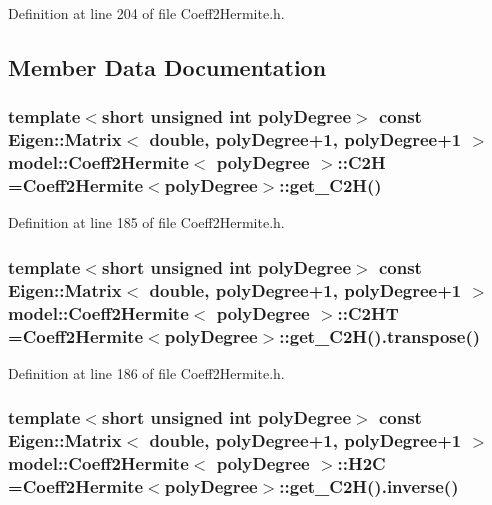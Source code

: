 Definition at line 204 of file Coeff2\+Hermite.\+h.



\subsection{Member Data Documentation}
\hypertarget{classmodel_1_1_coeff2_hermite_ae14edceaff44a7fc6c7eb731bb160c50}{}
\subsubsection[{C2\+H}]{\setlength{\rightskip}{0pt plus 5cm}template$<$short unsigned int poly\+Degree$>$ const Eigen\+::\+Matrix$<$ double, poly\+Degree+1, poly\+Degree+1 $>$ {\bf model\+::\+Coeff2\+Hermite}$<$ poly\+Degree $>$\+::C2\+H ={\bf Coeff2\+Hermite}$<$poly\+Degree$>$\+::get\+\_\+\+C2\+H()\hspace{0.3cm}{\ttfamily [static]}}\label{classmodel_1_1_coeff2_hermite_ae14edceaff44a7fc6c7eb731bb160c50}


Definition at line 185 of file Coeff2\+Hermite.\+h.

\hypertarget{classmodel_1_1_coeff2_hermite_ab08f71312bfb19e3322cf6963d703f8a}{}
\subsubsection[{C2\+H\+T}]{\setlength{\rightskip}{0pt plus 5cm}template$<$short unsigned int poly\+Degree$>$ const Eigen\+::\+Matrix$<$ double, poly\+Degree+1, poly\+Degree+1 $>$ {\bf model\+::\+Coeff2\+Hermite}$<$ poly\+Degree $>$\+::C2\+H\+T ={\bf Coeff2\+Hermite}$<$poly\+Degree$>$\+::get\+\_\+\+C2\+H().transpose()\hspace{0.3cm}{\ttfamily [static]}}\label{classmodel_1_1_coeff2_hermite_ab08f71312bfb19e3322cf6963d703f8a}


Definition at line 186 of file Coeff2\+Hermite.\+h.

\hypertarget{classmodel_1_1_coeff2_hermite_a0fd83992299e5470dc15b9a2d27cedb8}{}
\subsubsection[{H2\+C}]{\setlength{\rightskip}{0pt plus 5cm}template$<$short unsigned int poly\+Degree$>$ const Eigen\+::\+Matrix$<$ double, poly\+Degree+1, poly\+Degree+1 $>$ {\bf model\+::\+Coeff2\+Hermite}$<$ poly\+Degree $>$\+::H2\+C ={\bf Coeff2\+Hermite}$<$poly\+Degree$>$\+::get\+\_\+\+C2\+H().inverse()\hspace{0.3cm}{\ttfamily [static]}}\label{classmodel_1_1_coeff2_hermite_a0fd83992299e5470dc15b9a2d27cedb8}



